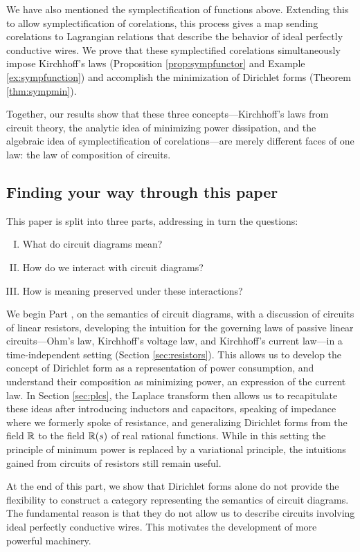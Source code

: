 We have also mentioned the symplectification of functions above.  Extending this to
allow symplectification of corelations, this process gives a map sending corelations
to Lagrangian relations that describe the behavior of ideal perfectly conductive wires. 
We prove that these symplectified corelations simultaneously impose Kirchhoff's 
laws (Proposition \ref{prop:sympfunctor} and Example \ref{ex:sympfunction}) and 
accomplish the minimization of Dirichlet forms (Theorem \ref{thm:sympmin}).  

Together, our results show that these three concepts---Kirchhoff's laws from circuit theory, 
the analytic idea of minimizing power dissipation, and the algebraic idea of symplectification of corelations---are merely different faces of one law: the law of composition of circuits.

\subsection{Finding your way through this paper}
This paper is split into three parts, addressing in turn the questions:
\begin{enumerate}[I.]
  \item What do circuit diagrams mean?
  \item How do we interact with circuit diagrams?
  \item How is meaning preserved under these interactions?
\end{enumerate}

We begin Part , on the semantics of circuit diagrams, with
a discussion of circuits of linear resistors, developing the intuition for the
governing laws of passive linear circuits---Ohm's law, Kirchhoff's voltage law,
and Kirchhoff's current law---in a time-independent setting (Section
\ref{sec:resistors}). This allows us to develop the concept of
Dirichlet form as a representation of power consumption, and understand their
composition as minimizing power, an expression of the current law. In Section
\ref{sec:plcs}, the Laplace transform then allows us to recapitulate these ideas
after introducing inductors and capacitors, speaking of impedance where we
formerly spoke of resistance, and generalizing Dirichlet forms from the field
${\mathbb{R}}$ to the field ${\mathbb{R}}(s)$ of real rational functions. While in this setting the
principle of minimum power is replaced by a variational principle,
the intuitions gained from circuits of resistors still remain useful. 

At the end of this part, we show that Dirichlet forms alone do not provide the 
flexibility to construct a category representing the semantics of circuit diagrams. 
The fundamental reason is that they do not allow us to describe circuits involving 
ideal perfectly conductive wires.  This motivates the development of more powerful machinery.

